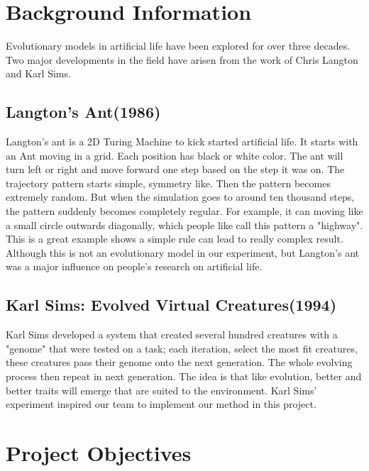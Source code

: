 \documentclass[letterpaper, 10 pt, conference]{ieeeconf}  %
\begin{document}
\section{Background Information}

Evolutionary models in artificial life have been explored for over three decades. Two major developments in the field have arisen from the work of Chris Langton and Karl Sims.

\subsection{Langton's Ant(1986)}
Langton's ant is a 2D Turing Machine to kick started artificial life. It starts with an Ant moving in a grid. Each position has black or white color. The ant will turn left or right and move forward one step based on the step it was on. The trajectory pattern starts simple, symmetry like. Then the pattern becomes extremely random. But when the simulation goes to around ten thousand steps, the pattern suddenly becomes completely regular. For example, it can moving like a small circle outwards diagonally, which people like call this pattern a "highway". This is a great example shows a simple rule can lead to really complex result. Although this is not an evolutionary model in our experiment, but Langton's ant was a major influence on people's research on artificial life. 


\subsection{Karl Sims: Evolved Virtual Creatures(1994)}

Karl Sims developed a system that created several hundred creatures with a "genome" that were tested on a task; each iteration, select the most fit creatures, these creatures pass their genome onto the next generation. The whole evolving process then repeat in next generation. The idea is that like evolution, better and better traits will emerge that are suited to the environment. Karl Sims' experiment inspired our team to implement our method in this project.

\section{Project Objectives}
\end{document}
